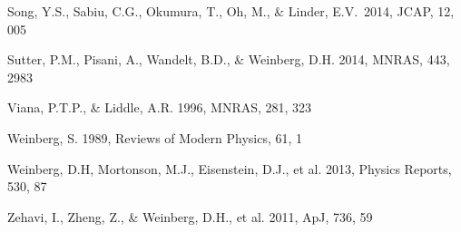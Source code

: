 \documentclass[iop]{emulateapj}
\begin{document}
\begin{thebibliography}{}
Song, Y.S., Sabiu, C.G., 
Okumura, T., Oh, M., \& Linder, E.V.\ 2014, JCAP, 12, 005 

Sutter, P.M., Pisani, A., Wandelt, B.D., \& Weinberg, D.H. 2014, MNRAS, 443, 2983




Viana, P.T.P., \& Liddle, A.R. 1996, MNRAS, 281, 323



Weinberg, S. 1989, Reviews of Modern Physics, 61, 1

Weinberg, D.H, Mortonson, M.J., Eisenstein, D.J., et al. 2013, Physics Reports, 530, 87




Zehavi, I., Zheng, Z., \& Weinberg, D.H., et al. 2011, ApJ, 736, 59




\end{thebibliography}
\end{document}
